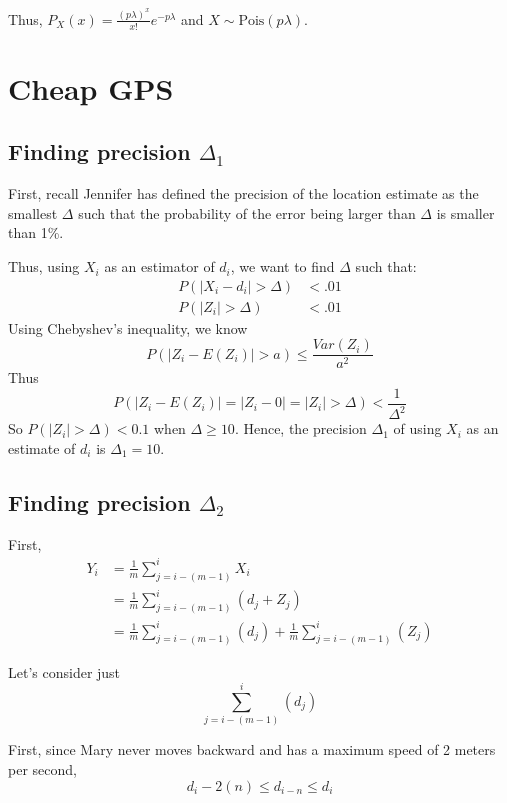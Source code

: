 \documentclass[paper=a4, fontsize=11pt]{scrartcl} %
\numberwithin{equation}{section} %
\numberwithin{figure}{section} %
\numberwithin{table}{section} %
\begin{document}
Thus, $P_X(x) = \frac{(p \lambda) ^x}{x!} e^{- p \lambda}$ and $X \sim \textrm{Pois}(p \lambda)$.


\section{Cheap GPS}

\subsection{Finding precision $\Delta_1$}

First, recall Jennifer has defined the precision of the location estimate as the smallest $\Delta$ such that the probability of the error being larger than $\Delta$ is smaller than 1\%.

Thus, using $X_i$ as an estimator of $d_i$, we want to find $\Delta$ such that:
\begin{align*}
P(|X_i - d_i| > \Delta) &< .01 \\
P(|Z_i| > \Delta) &< .01
\end{align*}
Using Chebyshev's inequality, we know
\[ P(|Z_i - E(Z_i)| > a) \leq \frac{Var(Z_i)}{a^2}\]
Thus 
\[P(|Z_i - E(Z_i)| = |Z_i - 0| = |Z_i| > \Delta) < \frac{1}{\Delta^2}\]
So $P(|Z_i| > \Delta) < 0.1$ when $\Delta \geq 10$. Hence, the precision $\Delta_1$ of using $X_i$ as an estimate of $d_i$ is $\Delta_1 = 10$.

\subsection{Finding precision $\Delta_2$}

First,
\begin{align*}
Y_i &= \frac{1}{m} \sum_{j = i - (m-1)}^{i} X_i \\
   &=  \frac{1}{m} \sum_{j = i - (m-1)}^{i} \left(d_j + Z_j \right) \\
   &=  \frac{1}{m} \sum_{j = i - (m-1)}^{i} \left(d_j \right) +\frac{1}{m} \sum_{j = i - (m-1)}^{i} \left(Z_j \right)
\end{align*}

Let's consider just
\[\sum_{j = i - (m-1)}^{i} \left(d_j \right) \]

First, since Mary never moves backward and has a maximum speed of 2 meters per second,
\[d_{i} - 2(n) \leq d_{i-n} \leq d_{i} \]
\end{document}
